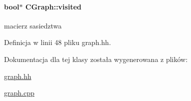 \paragraph[{visited}]{\setlength{\rightskip}{0pt plus 5cm}bool$\ast$ C\+Graph\+::visited}\label{class_c_graph_a8478f38bd0487246450f933dc4403227}
macierz sasiedztwa 

Definicja w linii 48 pliku graph.\+hh.



Dokumentacja dla tej klasy została wygenerowana z plików\+:\begin{DoxyCompactItemize}
\item 
\hyperlink{graph_8hh}{graph.\+hh}\item 
\hyperlink{graph_8cpp}{graph.\+cpp}\end{DoxyCompactItemize}
